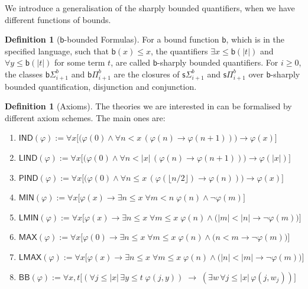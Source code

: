 \documentclass[11pt]{article}
\newcommand{\bd}{\mathsf{b}}
\newcommand{\abs}[1]{\lvert #1 \rvert}
\theoremstyle{definition}
\theoremstyle{definition}
\newtheorem{definition}[theorem]{Definition}
\theoremstyle{remark}
\begin{document}
We introduce a generalisation of the sharply bounded quantifiers, when we have different functions of bounds.
\begin{definition}[$\bd$-bounded Formulas]
    For a bound function $\bd$, which is in the specified language, such that $\bd(x)\leq x$, the quantifiers $\exists x\leq \bd(|t|)$ and $\forall y\leq \bd(|t|)$ for some term $t$, are called $\bd$-sharply bounded quantifiers. For $i\geq 0$, the classes $\bd\Sigma^b_{i+1}$ and $\bd\Pi^b_{i+1}$ are the closures of $\mathsf{s}\Sigma^b_{i+1}$ and $\mathsf{s}\Pi^b_{i+1}$ over $\bd$-sharply bounded quantification, disjunction and conjunction.
\end{definition}

\begin{definition}[Axioms]
The theories we are interested in can be formalised by different axiom schemes. The main ones are:
\begin{enumerate}
    \item $\mathsf{IND}(\varphi):= \forall x \Big[\big(\varphi(0) \land \forall n <  x\, (\varphi(n)\rightarrow \varphi(n+1))\big) \rightarrow \varphi(x)\Big]$
    \item $\mathsf{LIND}(\varphi):= \forall x \Big[\big(\varphi(0) \land \forall n <  |x|\, (\varphi(n)\rightarrow \varphi(n+1))\big) \rightarrow \varphi(|x|)\Big]$
    \item $\mathsf{PIND}(\varphi):= \forall x \Big[\big(\varphi(0) \land \forall n \leq x\, (\varphi(\lfloor n/2 \rfloor )\rightarrow \varphi(n))\big) \rightarrow \varphi(x)\Big]$
    \item $\mathsf{MIN}(\varphi):= \forall x \Big[\varphi (x) \rightarrow \exists n\leq x\;\forall m<n\;\varphi(n) \land \neg \varphi(m) \Big]$
    \item $\mathsf{LMIN}(\varphi):= \forall x \Big[\varphi (x) \rightarrow \exists n\leq x\;\forall m\leq x\;\varphi(n) \land \big(\abs{m}<\abs{n} \rightarrow \neg \varphi(m) \big)\Big]$
    \item $\mathsf{MAX}(\varphi):= \forall x \Big[\varphi (0) \rightarrow \exists n\leq x\;\forall m\leq x\;\varphi(n) \land \big(n<m \rightarrow \neg \varphi(m) \big)\Big]$
    \item $\mathsf{LMAX}(\varphi):= \forall x \Big[\varphi (x) \rightarrow \exists n\leq x\;\forall m\leq x\;\varphi(n) \land \big(\abs{n}<\abs{m} \rightarrow \neg \varphi(m) \big)\Big]$
    \item $\mathsf{BB}(\varphi):= \forall x,t \Big[(\forall j \leq |x| \, \exists y \leq t \; \varphi(j,y))\;\rightarrow\;(\exists w \, \forall j \leq |x| \, \varphi(j, w_j)) \Big]$
\end{enumerate}
\end{definition}
\end{document}

